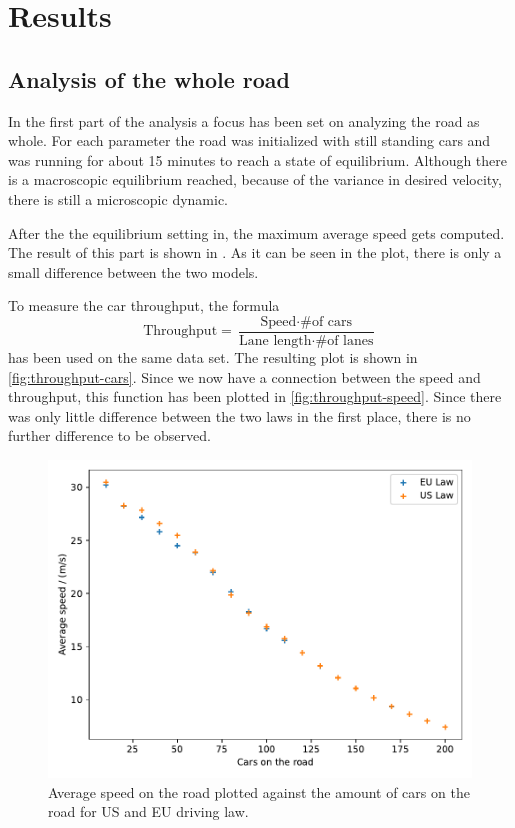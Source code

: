 \section{Results}
\label{sec:results}

\subsection{Analysis of the whole road}
\label{sec:results:whole}
In the first part of the analysis a focus has been set on analyzing the road as whole. For each
parameter the road was initialized with still standing cars and was running for about 15 minutes to
reach a state of equilibrium. Although there is a macroscopic equilibrium reached, because of the
variance in desired velocity, there is still a microscopic dynamic.

After the the equilibrium setting in, the maximum average speed gets computed. The result of this
part is shown in \label{fig:speed-cars}. As it can be seen in the plot, there is only a small 
difference between the two models. 

To measure the car throughput, the formula
\[
  \text{Throughput} = \frac{\text{Speed} \cdot \text{\#  of cars}}
  {\text{Lane length} \cdot \text{\# of lanes}}
\]
has been used on the same data set. The resulting plot is shown in \autoref{fig:throughput-cars}.
Since we now have a connection between the speed and throughput, this function has been plotted in
\autoref{fig:throughput-speed}. Since there was only little difference between the two laws in the
first place, there is no further difference to be observed.
\begin{figure}[H]
	\centering
	\includegraphics[width=0.9\linewidth]{media/ave_speed_comparison.pdf}
	\caption{Average speed on the road plotted against the amount of cars on the road for US and EU driving law.}
	\label{fig:speed-cars}
\end{figure}

